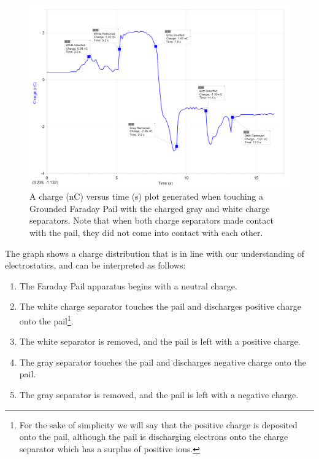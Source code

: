 \documentclass[12pt]{amsart}
\begin{document}
 
\begin{figure}[h]
	\includegraphics[width=\medgraph,scale=0.01]{SeparatorsContact.png}
	\caption{ A charge (nC) versus time (s) plot generated when touching a Grounded Faraday Pail with the charged gray and white charge separators. Note that when both charge separators made contact with the pail, they did not come into contact with each other.}
	\label{Contact}
\end{figure} 
\newpage
\indent The graph shows a charge distribution that is in line with our understanding of electrostatics, and can be interpreted as follows:
\begin{enumerate}
	\item The Faraday Pail apparatus begins with a neutral charge.
	\item The white charge separator touches the pail and discharges positive charge onto the pail\footnote{For the sake of simplicity we will say that the positive charge is deposited onto the pail, although the pail is discharging electrons onto the charge separator which has a surplus of positive ions.}.
	\item The white separator is removed, and the pail is left with a positive charge.
	\item The gray separator touches the pail and discharges negative charge onto the pail.
	\item The gray separator is removed, and the pail is left with a negative charge.  
\end{enumerate}
\end{document}
